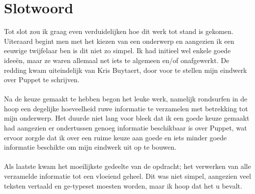 \chapter*{Slotwoord}
Tot slot zou ik graag even verduidelijken hoe dit werk tot stand is gekomen. Uiteraard begint men met het kiezen van een onderwerp en aangezien ik een eeuwige twijfelaar ben is dit niet zo simpel. Ik had initieel wel enkele goede idee\"{e}n, maar ze waren allemaal net iets te algemeen en/of onafgewerkt. De redding kwam uiteindelijk van Kris Buytaert, door voor te stellen mijn eindwerk over Puppet te schrijven.\\\\
Na de keuze gemaakt te hebben begon het leuke werk, namelijk rondsurfen in de hoop een degelijke hoeveelheid ruwe informatie te verzamelen met betrekking tot mijn onderwerp. Het duurde niet lang voor bleek dat ik een goede keuze gemaakt had aangezien er ondertussen genoeg informatie beschikbaar is over Puppet, wat ervoor zorgde dat ik over een ruime keuze aan goede en iets minder goede informatie beschikte om mijn eindwerk uit op te bouwen.\\\\
Als laatste  kwam het moeilijkste gedeelte van de opdracht; het verwerken van alle verzamelde informatie tot een vloeiend geheel. Dit was niet simpel, aangezien veel teksten vertaald en ge-typeset moesten worden, maar ik hoop dat het u bevalt.
